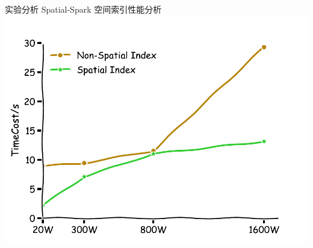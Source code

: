 \begin{frame}[c]{实验分析}
    Spatial-Spark 空间索引性能分析
    \vspace{1em}
    \includegraphics[scale=0.55]{figures/index.pdf}
\end{frame}


